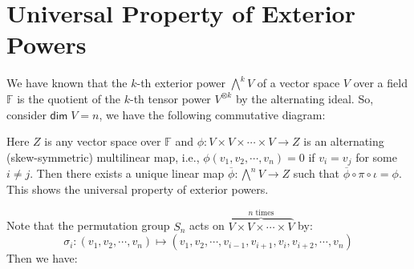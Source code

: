 \documentclass[
	11pt, %
	fleqn, %
	a4paper, %
]{LegrandOrangeBook}
\renewcommand{\bar}[1]{\overline{#1}} %
\newcommand{\F}{\mathbb{F}} %
\renewcommand{\dim}{\mathsf{dim\;}} %
\begin{document}
\newpage

\section{Universal Property of Exterior Powers}

We have known that the $k$-th exterior power ${\bigwedge}^k V$ of a vector space $V$ over a field $\F$ is the quotient of the $k$-th tensor power $V^{\otimes k}$ by the alternating ideal. So, consider $\dim{V} = n$, we have the following commutative diagram:
\begin{center}
\end{center}
Here $Z$ is any vector space over $\F$ and $\phi : V \times V \times \cdots \times V \to Z$ is an alternating (skew-symmetric) multilinear map, i.e., $\phi(v_1, v_2, \cdots, v_n) = 0$ if $v_i = v_j$ for some $i \neq j$. Then there exists a unique linear map $\bar{\phi} : {\bigwedge}^n V \to Z$ such that $\bar{\phi} \circ \pi \circ \iota = \phi$. This shows the universal property of exterior powers.

Note that the permutation group $S_n$ acts on $\overbrace{V \times V \times \cdots \times V}^{n \text{ times}}$ by:
\[
    \sigma_i : (v_1, v_2, \cdots, v_n) \mapsto (v_1, v_2, \cdots, v_{i - 1}, v_{i + 1}, v_i, v_{i + 2}, \cdots, v_n)
\]
Then we have:
\begin{center}
\end{center}




\end{document}
